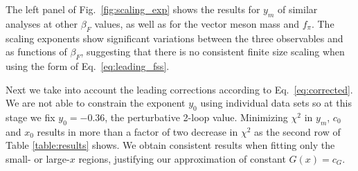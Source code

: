 \documentclass[aps,prl,twocolumn,]{revtex4}  %
\newcommand{\eq}[1]{Eq.~\ref{#1}}
\newcommand{\fig}[1]{Fig.~\ref{#1}}
\begin{document}
The left panel of \fig{fig:scaling_exp} shows the results for $y_m$ of similar analyses at other $\beta_F$ values, as well as for the vector meson mass and $f_\pi$.
The scaling exponents show significant variations between the three observables and as functions of $\beta_F$, suggesting that there is no consistent finite size scaling when using the form of \eq{eq:leading_fss}.

Next we take into account the leading corrections according to \eq{eq:corrected}. We are not able to constrain  the exponent $y_0$ using individual data sets so at this stage we fix $y_0=-0.36$, the perturbative  2-loop value. Minimizing $\chi^2$ in $y_m$, $c_0$ and $x_0$ results in more than a factor of two decrease in $\chi^2$  as the second row of Table \ref{table:results} shows. We obtain consistent results when fitting only the small- or large-$x$ regions, justifying our approximation of constant $G(x) = c_G$. %
\end{document}
